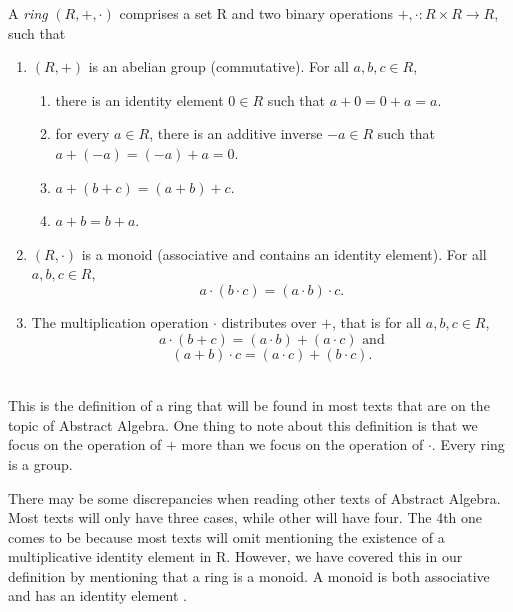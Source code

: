 \documentclass{article}
\begin{document}
\begin{definition}\label{def:Ring}
    A \emph{ring} $(R, +, \cdot)$ comprises a set R and two binary operations $+, \cdot:R\times R \rightarrow R$, such that
    \begin{enumerate}
        \item $(R, +)$ is an abelian group (commutative). For all $a,b,c \in R$,
            \begin{enumerate}
                \item there is an identity element $0 \in R$ such that $a+0=0+a=a$.
                \item for every $a \in R$, there is an additive inverse $-a \in R$ such that $a+(-a) = (-a)+a=0$.
                \item $a+(b+c)=(a+b)+c$.
                \item $a+b=b+a$.
            \end{enumerate}
        \item $(R, \cdot)$ is a monoid (associative and contains an identity element). For all $a,b,c \in R$,
            \[
                a \cdot (b \cdot c) = (a \cdot b) \cdot c.
            \]
        \item The multiplication operation $\cdot$ distributes over $+$, that is for all $a,b,c \in R$,
            \[
                a \cdot (b + c) = (a \cdot b) + (a \cdot c) \text{ and}
             \]
             \[
                (a + b) \cdot c = (a \cdot c) + (b \cdot c).
             \]
    \end{enumerate}
\end{definition} \cite{AdvancedMath} \\

This is the definition of a ring that will be found in most texts that are on the topic of Abstract Algebra. One thing to note about
this definition is that we focus on the operation of $+$ more than we focus on the operation of $\cdot$.
Every ring is a group.

\begin{remark}
    There may be some discrepancies when reading other texts of Abstract Algebra. Most texts will only have three cases, while other will have four. The 4th one comes to be because most texts will omit mentioning the existence of a multiplicative identity element in R. However, we have covered this in our definition by mentioning that a ring is a monoid. A monoid is both associative and has an identity element \cite{FirstCourse}. \\
\end{remark}
\end{document}
